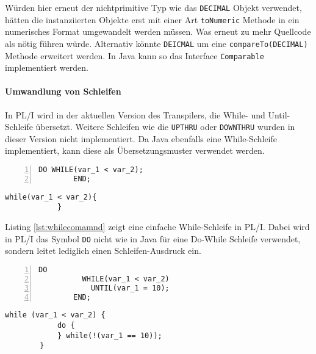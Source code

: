Würden hier erneut der nichtprimitive Typ wie das \verb+DECIMAL+ Objekt verwendet, hätten die instanziierten Objekte erst mit einer Art \verb+toNumeric+ Methode in ein numerisches Format umgewandelt werden müssen. Was erneut zu mehr Quellcode als nötig führen würde. Alternativ könnte \verb+DEICMAL+ um eine \verb+compareTo(DECIMAL)+ Methode erweitert werden. In Java kann so das Interface \verb+Comparable+ implementiert werden. 

\pagebreak
\paragraph{Umwandlung von Schleifen}
In PL/I wird in der aktuellen Version des Transpilers, die  While- und Until-Schleife übersetzt.
Weitere Schleifen wie die \verb+UPTHRU+ oder \verb+DOWNTHRU+ wurden in dieser Version nicht implementiert.
Da Java ebenfalls eine While-Schleife implementiert, kann diese als Übersetzungsmuster verwendet werden.

\begin{minipage}[b]{0.48\linewidth}
	\centering
	\lstset{language=PL/I,label=SliceExaple}
	\begin{lstlisting}[frame=single, numbers=left, mathescape,%
		caption={While-Schleife}, label={lst:whilecomamnd}]
		DO WHILE(var_1 < var_2);
		END;
	\end{lstlisting}
\end{minipage}
\hspace{0.5cm}
\begin{minipage}[b]{0.48\linewidth}
	\centering
	\lstset{language=Java,label=SliceExaple}
	\begin{lstlisting}[frame=single, mathescape,%
		title={" "}]
			while(var_1 < var_2){
			}
	\end{lstlisting}
\end{minipage} 

Listing \ref{lst:whilecomamnd} zeigt eine einfache While-Schleife in PL/I.
Dabei wird in PL/I das Symbol \verb+DO+ nicht wie in Java für eine Do-While
Schleife verwendet, sondern leitet lediglich einen Schleifen-Ausdruck ein.

\begin{minipage}[b]{0.48\linewidth}
	\centering
	\lstset{language=PL/I,label=SliceExaple}
	\begin{lstlisting}[frame=single, numbers=left, mathescape,%
		caption={While-Until-Schleife}, label={lst:untilwhile}]
		DO 
		  WHILE(var_1 < var_2) 
		  	UNTIL(var_1 = 10);
		END;
	\end{lstlisting}
\end{minipage}
\hspace{0.5cm}
\begin{minipage}[b]{0.48\linewidth}
	\centering
	\lstset{language=Java,label=SliceExaple}
	\begin{lstlisting}[frame=single, mathescape,%
		title={" "}]
		while (var_1 < var_2) {
			do {
			} while(!(var_1 == 10));
		}
	\end{lstlisting}
\end{minipage} 


